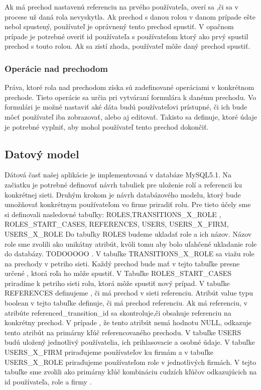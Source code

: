 Ak má prechod nastavenú referenciu na prvého používateľa, overí sa ,či sa v procese už daná rola nevyskytla. Ak prechod s danou rolou v danom prípade ešte nebol spustený, používateľ je oprávnený tento prechod spustiť. V opačnom prípade je potrebné overiť id používateľa s používateľom ktorý ako prvý spustil prechod s touto rolou. Ak sa zistí zhoda, používateľ môže daný prechod spustiť.



\subsubsection{Operácie nad prechodom}	
Práva, ktoré rola nad prechodom získa sú zadefinované operáciami v konkrétnom prechode. Tieto operácie sa určia pri vytváraní formulára k danému prechodu.  
Vo formulári je možné nastaviť aké dáta budú používateľovi prístupné, či ich bude môcť používateľ iba zobrazovať, alebo aj editovať. Takisto sa definuje, ktoré údaje je potrebné vyplniť, aby mohol používateľ tento prechod dokončiť.


\subsection{Datový model}
Dátová časť našej aplikácie je implementovaná v databáze MySQL5.1. Na začiatku je potrebné definovať návrh tabuliek pre uloženie rolí a referencii ku konkrétnej sieti. Druhým krokom je návrh databázového modelu, ktorý bude umožňovať konkrétnym používateľom vo firme priradiť rolu.
Pre tieto účely sme si definovali nasledovné tabuľky:
ROLES,TRANSITIONS\_X\_ROLE , ROLES\_START\_CASES, REFERENCES, USERS, USERS\_X\_FIRM, USERS\_X\_ROLE 
Do tabuľky ROLES budeme ukladať role a ich názov. Názov role sme zvolili ako unikátny atribút, kvôli tomu aby bolo uľahčené ukladanie role do databázy. TODOOOOO . V tabuľke TRANSITIONS\_X\_ROLE sa viažu role na prechody v petriho sieti. Každý prechod bude mať v tejto tabuľke presne určené , ktorá roľa ho môže spustiť. V Tabuľke ROLES\_START\_CASES priradíme k petriho sieti rolu, ktorá môže spustiť nový prípad. V tabuľke REFERENCES definujeme , či má prechod v sieti referenciu. Atribút  value typu boolean v tejto tabuľke definuje, či má prechod referenciu. Ak má referenciu, v atribúte referenced\_transition\_id sa skontroluje,či obsahuje referenciu na konkrétny prechod. V prípade , že tento atribút nemá hodnotu NULL, odkazuje tento atribút na primárny kľúč referencovaného prechodu. V tabuľke USERS budú uložený jednotlivý používatelia, ich prihlasovacie a osobné údaje. V tabuľke USERS\_X\_FIRM priraďujeme používateľov ku firmám a v tabuľke USERS\_X\_ROLE priraďujeme používateľom role v jednotlivých firmách. V tejto tabuľke sme zvolili ako primárny kľúč kombináciu cudzích kľúčov odkazujúcich na id používateľa, role a firmy . 



